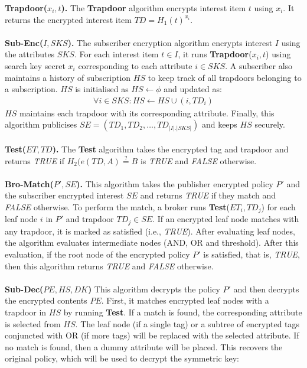 \documentclass[epsfig,a4paper,11pt,titlepage]{book}
\numberwithin{algorithm}{chapter}
\begin{document}
\textbf{Trapdoor($x_i, t$).} The \textbf{Trapdoor} algorithm encrypts interest item $t$ using $x_i$. It returns the encrypted interest item $TD = H_1 (t)^{x_i}$. \\ \\
\textbf{Sub-Enc($I, SKS$).} The subscriber encryption algorithm encrypts interest $I$ using the attributes $SKS$. For each interest item $t \in I$, it runs \textbf{Trapdoor}($x_i, t$) using search key secret $x_i$ corresponding to each attribute $i \in SKS$. A subscriber also maintains a history of subscription $HS$ to keep track of all trapdoors belonging to a subscription. $HS$ is initialised as $HS \leftarrow \phi$ and updated as: 
\begin{align*}
\forall i \in SKS: HS \leftarrow HS \cup (i, TD_i)
\end{align*}
$HS$ maintains each trapdoor with its corresponding attribute. Finally, this algorithm publicises $SE = (TD_1, TD_2, \ldots, TD_{|I| . |SKS|})$ and keeps $HS$ securely. \\ \\
\textbf{Test($ET, TD$).} The \textbf{Test} algorithm takes the encrypted tag and trapdoor and returns \emph{TRUE} if $H_2 (e(TD, A) \stackrel{?}{=} B$ is \emph{TRUE} and \emph{FALSE} otherwise. \\ \\
\textbf{Bro-Match($P', SE$).} This algorithm takes the publisher encrypted policy $P'$ and the subscriber encrypted interest $SE$ and returns \emph{TRUE} if they match and \emph{FALSE} otherwise. To perform the match, a broker runs \textbf{Test}($ET_i, TD_j$) for each leaf node $i$ in $P'$ and trapdoor $TD_j \in SE$. If an encrypted leaf node matches with any trapdoor, it is marked as satisfied (i.e., \emph{TRUE}). After evaluating leaf nodes, the algorithm evaluates intermediate nodes (AND, OR and threshold). After this evaluation, if the root node of the encrypted policy $P'$ is satisfied, that is, \emph{TRUE}, then this algorithm returns \emph{TRUE} and \emph{FALSE} otherwise. \\ \\
\textbf{Sub-Dec($PE, HS, DK$)} This algorithm decrypts the policy $P'$ and then decrypts the encrypted contents $PE$. First, it matches encrypted leaf nodes with a trapdoor in $HS$ by running \textbf{Test}. If a match is found, the corresponding attribute is selected from $HS$. The leaf node (if a single tag) or a subtree of encrypted tags conjuncted with OR (if more tags) will be replaced with the selected attribute. If no match is found, then a dummy attribute will be placed. This recovers the original policy, which will be used to decrypt the symmetric key:
\end{document}
